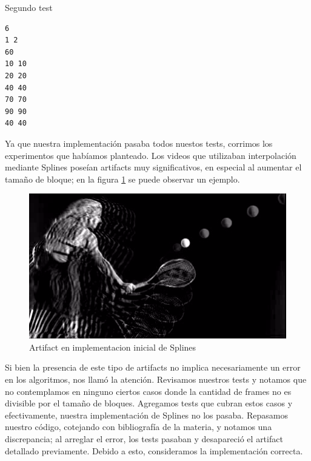 \caption{Segundo test}
\begin{verbatim}
6
1 2
60
10 10
20 20
40 40
70 70
90 90
40 40
\end{verbatim}

\par Ya que nuestra implementaci\'on pasaba todos nuestos tests, corrimos los experimentos que hab\'iamos planteado.
Los videos que utilizaban interpolaci\'on mediante Splines pose\'ian artifacts muy significativos, en especial al aumentar el tama\~no de bloque; en la figura \ref{TenisSplineArtifact} se puede observar un ejemplo.

\FloatBarrier
\begin{figure}[h]
\begin{center}
\caption{Artifact en implementacion inicial de Splines}
\label{TenisSplineArtifact}
\includegraphics[width=0.9\columnwidth]{imagenes/cualitativos/TAS.png}
\end{center}
\end{figure}
\FloatBarrier

\par Si bien la presencia de este tipo de artifacts no implica necesariamente un error en los algoritmos, nos llam\'o la atenci\'on.
Revisamos nuestros tests y notamos que no contemplamos en ninguno ciertos casos donde la cantidad de frames no es divisible por el tama\~no de bloques.
Agregamos tests que cubran estos casos y efectivamente, nuestra implementaci\'on de Splines no los pasaba.
Repasamos nuestro c\'odigo, cotejando con bibliograf\'ia de la materia\cite{Burden}, y notamos una discrepancia;
al arreglar el error, los tests pasaban y desapareci\'o el artifact detallado previamente.
Debido a esto, consideramos la implementaci\'on correcta.
